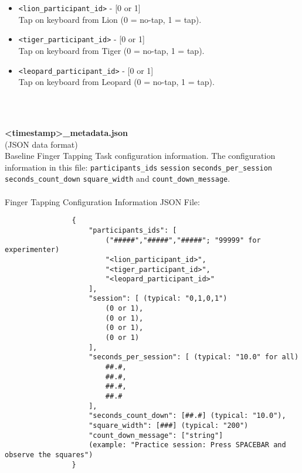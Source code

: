 \begin{description}
\begin{addmargin}[0em]{0em}
\begin{addmargin}[1em]{0em}
\begin{itemize}
                \item \verb|<lion_participant_id>| - [0 or 1]\\Tap on keyboard from Lion (0 = no-tap, 1 = tap).
                \item \verb|<tiger_participant_id>| - [0 or 1]\\Tap on keyboard from Tiger (0 = no-tap, 1 = tap).
                \item \verb|<leopard_participant_id>| - [0 or 1]\\Tap on keyboard from Leopard (0 = no-tap, 1 = tap).
            \end{itemize}
        \end{addmargin} %


        \textbf{\\\\}
        \begin{addmargin}[1em]{0em} %
            \textbf{<timestamp>\_metadata.json}\\(JSON data format)\\
            Baseline Finger Tapping Task configuration information. The configuration
            information in this file: \verb|participants_ids| \verb|session|
            \verb|seconds_per_session| \verb|seconds_count_down| \verb|square_width| and
            \verb|count_down_message|.\\\\
            Finger Tapping Configuration Information JSON File:
            \begin{verbatim}
                {
                    "participants_ids": [
                        ("#####","#####","#####"; "99999" for experimenter)
                        "<lion_participant_id>",
                        "<tiger_participant_id>",
                        "<leopard_participant_id>"
                    ],
                    "session": [ (typical: "0,1,0,1")
                        (0 or 1),
                        (0 or 1),
                        (0 or 1),
                        (0 or 1)
                    ],
                    "seconds_per_session": [ (typical: "10.0" for all)
                        ##.#,
                        ##.#,
                        ##.#,
                        ##.#
                    ],
                    "seconds_count_down": [##.#] (typical: "10.0"),
                    "square_width": [###] (typical: "200")
                    "count_down_message": ["string"]
                    (example: "Practice session: Press SPACEBAR and observe the squares")
                }
            \end{verbatim}
        \end{addmargin} %


\end{addmargin}
\end{description}
